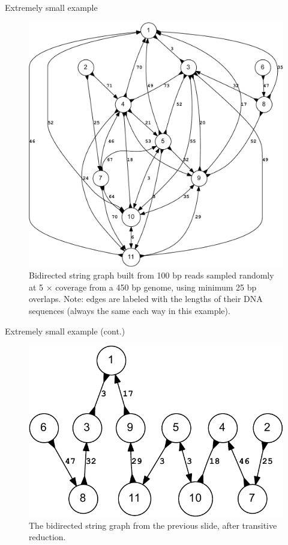 \documentclass[xcolor=dvipsnames]{beamer}
\begin{document}
\begin{frame}{Extremely small example}
    \begin{figure}[H]
        \includegraphics[scale=0.25]{example.bidigraph-crop.pdf}
        \caption{Bidirected string graph built from 100 bp reads sampled
        randomly at 5 $\times$ coverage from a 450 bp genome, using minimum 25
        bp overlaps.  Note: edges are labeled with the lengths of their DNA
        sequences (always the same each way in this example).}
    \end{figure}
\end{frame}

\begin{frame}{Extremely small example (cont.)}
    \begin{figure}[H]
        \includegraphics[scale=0.7]{example.reduced.mapped.bidigraph-crop.pdf}
        \caption{The bidirected string graph from the previous slide, after
        transitive reduction.}
    \end{figure}
\end{frame}
\end{document}
